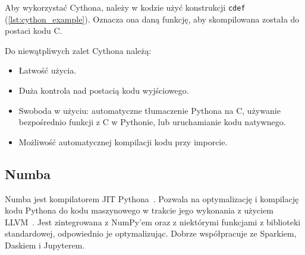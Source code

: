 Aby wykorzystać Cythona, należy w kodzie użyć konstrukcji \texttt{cdef}
(\cref{lst:cython_example}).
Oznacza ona daną funkcję, aby skompilowana została do postaci kodu C\@.

Do niewątpliwych zalet Cythona należą:
\begin{itemize}
    \item Łatwość użycia.
    \item Duża kontrola nad postacią kodu wyjściowego.
    \item Swoboda w użyciu: automatyczne tłumaczenie Pythona na C,
    używanie bezpośrednio funkcji z C w Pythonie, lub uruchamianie
    kodu natywnego.
    \item Możliwość automatycznej kompilacji kodu przy imporcie.
\end{itemize}

\subsection{Numba}

Numba jest kompilatorem JIT Pythona~\cite{numba}.
Pozwala na optymalizację i kompilację kodu Pythona do kodu maszynowego
w trakcie jego wykonania z użyciem LLVM~\cite{llvm}.
Jest zintegrowana z NumPy'em oraz z niektórymi funkcjami z biblioteki
standardowej, odpowiednio je optymalizując.
Dobrze współpracuje ze Sparkiem, Daskiem i Jupyterem.

